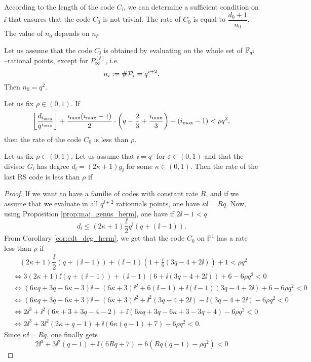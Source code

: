 \documentclass[10pt]{article}
\begin{document}
According to the length of the code $C_{\ii}$, we can determine a sufficient condition on $\ii$ that ensures that the code $C_0$ is not trivial. The rate of $C_0$ is equal to $\dfrac{d_0+1}{n_0}$. The value of $n_0$ depends on $n_{\ii}$.

Let us assume that the code $C_{\ii}$ is obtained by evaluating on the whole set of $\mathbb{F}_{q^2}$--rational points, except for $P_\infty^{(\ii)}$, i.e. 
\[n_i := \#\mathcal{P}_i = q^{i+2}.\]
Then $n_0=q^2$. 

\begin{corollary}\label{cor:cdt_deg_herm}
Let us fix $\rho \in (0,1)$. If
\[ \left\lfloor \dfrac{d_{i_{\rm{max}}}}{q^{i_{\rm{max}}}}\right\rfloor + \dfrac{i_{\rm{max}}(i_{\rm{max}}-1)}{2}\cdot \left(q-\frac{2}{3} + \frac{i_{\rm{max}}}{3}\right) + (i_{\rm{max}}-1) < \rho q^2,\]
then the rate of the code $C_0$ is less than $\rho$.
\end{corollary}

\newpage

\begin{proposition} 
Let us fix $\rho \in (0,1)$. Let us assume that $\ii=q^{\varepsilon}$ for $\varepsilon \in (0,1)$ and that the divisor $G_{\ii}$ has degree $d_{\ii} = (2\kappa+1)g_{\ii}$ for some $\kappa \in (0,1)$. Then the rate of the last RS code is less than $\rho$ if 
\end{proposition}

\begin{proof}
If we want to have a familie of codes with constant rate $R$, and if we assume that we evaluate in all $q^{\ii+2}$ rationnals points, one have $\kappa \ii = Rq$. 
Now, using Proposition \ref{prop:maj_genus_herm}, one have if $2\ii-1<q$ 
\[ d_{\ii} \leq (2\kappa+1)\dfrac{\ii}{2}q^{\ii}(q+(\ii-1)).\]
From Corollary \ref{cor:cdt_deg_herm}, we get that the code $C_0$ on $\mathbb{P}^1$ has a rate less than $\rho$ if 
\begin{align*}
& \quad (2\kappa+1)\dfrac{\ii}{2}(q+(\ii-1)) + (\ii-1)\left(1+\frac{\ii}{6}(3q-4+2\ii)\right)+1 < \rho q^2 \\
& \iff 3(2\kappa+1)\ii(q+(\ii-1))+ (\ii-1)(6+\ii(3q-4+2\ii))+6 - 6\rho q^2 <0 \\
& \iff (6\kappa q+3q - 6\kappa-3)\ii + (6\kappa+3)\ii^2 + 6(\ii-1) + \ii(\ii-1)(3q-4+2\ii)+6-6\rho q^2 < 0 \\
& \iff (6\kappa q+3q - 6\kappa+3)\ii + (6\kappa+3)\ii^2 + \ii^2(3q-4+2\ii) - \ii(3q-4+2\ii) - 6\rho q^2 < 0 \\
& \iff 2\ii^3 + \ii^2(6\kappa+3+3q-4-2) + \ii(6\kappa q+3q-6\kappa+3-3q+4) - 6\rho q^2 < 0 \\
& \iff 2\ii^3 + 3\ii^2(2\kappa+q-1) + \ii (6\kappa(q-1)+7) - 6\rho q^2 <0.
\end{align*}
Since $\kappa \ii = Rq$, one finally gets
\[2\ii^3 + 3\ii^2(q-1) + \ii(6Rq+7) + 6(Rq(q-1)-\rho q^2) < 0\]
\end{proof}
\end{document}
